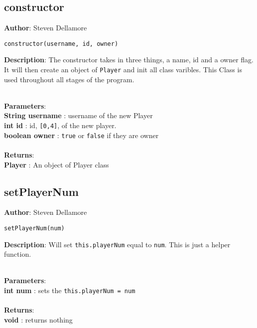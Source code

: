 \documentclass[12pt]{article}
\begin{document}
\subsection{constructor}
\textbf{Author}: Steven Dellamore 
\vspace*{1\baselineskip}
\begin{lstlisting}
constructor(username, id, owner)
\end{lstlisting} 
\vspace*{1\baselineskip}
\textbf{Description}: The constructor takes in three things, a name, id and a owner flag. It will then create an object of \texttt{Player} and init all class varibles. This Class is used throughout all stages of the program. 


\textbf{\large{\\Parameters}}:\\
\textbf{String username }: username of the new Player\\
\textbf{int id }: id, \texttt{[0,4]}, of the new player.\\
\textbf{boolean owner }: \texttt{true} or \texttt{false} if they are owner\\\textbf{\large{\\Returns}}:\\\textbf{Player }: An object of Player class

\subsection{setPlayerNum}
\textbf{Author}: Steven Dellamore 
\vspace*{1\baselineskip}
\begin{lstlisting}
setPlayerNum(num)
\end{lstlisting} 
\vspace*{1\baselineskip}
\textbf{Description}: Will set \texttt{this.playerNum} equal to \texttt{num}. This is just a helper function. 


\textbf{\large{\\Parameters}}:\\
\textbf{int num }: sets the \texttt{this.playerNum = num}\\\textbf{\large{\\Returns}}:\\\textbf{void }: returns nothing
\end{document}
